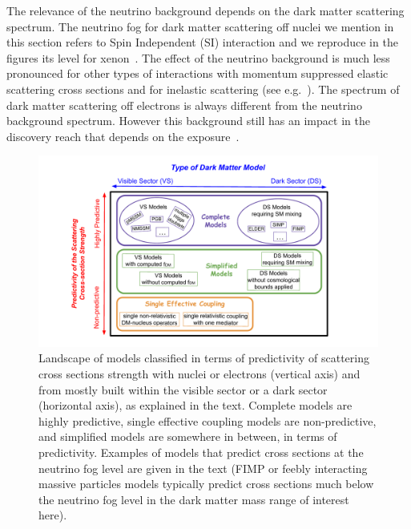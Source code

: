  The relevance of the neutrino background depends on the  dark matter scattering spectrum. The neutrino fog for dark matter scattering off nuclei we mention in this section refers to Spin Independent (SI) interaction and we reproduce in the figures its level for xenon~\cite{Billard:2013qya,Ruppin:2014bra}.  The effect of the neutrino background is much less pronounced for other types of interactions with momentum suppressed elastic  scattering cross sections and for inelastic scattering (see e.g.~\cite{Gelmini:2018ogy}). The spectrum of dark matter scattering off electrons is always different from the neutrino background spectrum. However this background still has an impact in the discovery reach that depends on the exposure~\cite{Essig:2018tss,Wyenberg:2018eyv}.  
 \begin{figure}[t]
\begin{center}
\includegraphics[width=1.0\columnwidth]{figures/model_classification.pdf}
\caption{Landscape of models classified in terms of predictivity of scattering cross sections strength with nuclei or electrons (vertical axis) and from mostly built within the visible sector or a dark sector (horizontal axis), as explained in the text.  Complete models are highly predictive, single effective coupling models are non-predictive, and simplified models are somewhere in between, in terms of predictivity. Examples of models that predict cross sections at the neutrino fog level are given in the text (FIMP or feebly interacting massive particles models typically predict  cross sections much below the neutrino fog level in the dark matter mass range of interest here).  
}
\label{fig:lanscape_theory}
\end{center}
\end{figure}

